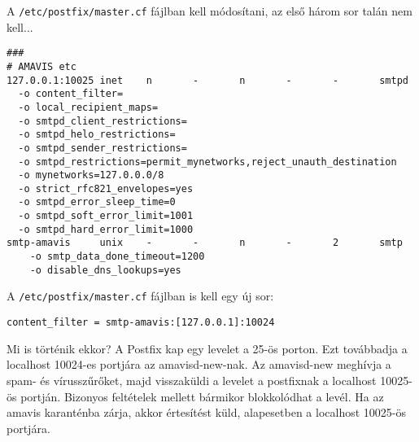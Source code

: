 A \texttt{/etc/postfix/master.cf} fájlban kell módosítani, az első három sor talán nem kell...


\begin{Verbatim}[frame=single,label=master.cf részlet]
###
# AMAVIS etc
127.0.0.1:10025 inet    n       -       n       -       -       smtpd
  -o content_filter=
  -o local_recipient_maps=
  -o smtpd_client_restrictions=
  -o smtpd_helo_restrictions=
  -o smtpd_sender_restrictions=
  -o smtpd_restrictions=permit_mynetworks,reject_unauth_destination
  -o mynetworks=127.0.0.0/8
  -o strict_rfc821_envelopes=yes
  -o smtpd_error_sleep_time=0
  -o smtpd_soft_error_limit=1001
  -o smtpd_hard_error_limit=1000
smtp-amavis     unix    -       -       n       -       2       smtp
    -o smtp_data_done_timeout=1200
    -o disable_dns_lookups=yes
\end{Verbatim}
\noindent A \texttt{/etc/postfix/master.cf} fájlban is kell egy új sor:

\begin{Verbatim}[frame=single]
content_filter = smtp-amavis:[127.0.0.1]:10024
\end{Verbatim}

Mi is történik ekkor? A Postfix kap egy levelet a 25-ös porton. Ezt továbbadja a localhost 10024-es portjára az
amavisd-new-nak. Az amavisd-new meghívja a spam- és vírusszűrőket, majd visszaküldi a levelet a postfixnak a
localhost 10025-ös portján. Bizonyos feltételek mellett bármikor blokkolódhat a levél. Ha az amavis karanténba zárja,
akkor értesítést küld, alapesetben a localhost 10025-ös portjára.


